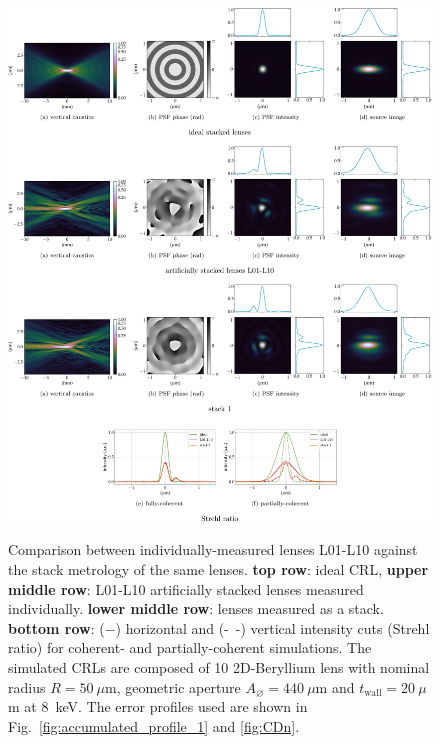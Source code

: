 \begin{refsection}
\begin{figure}[ht]
        \centering
        {\includegraphics[width=1\linewidth]{figures/ch05/CDn_vs_CDnStack.pdf}}
        \caption[Artificially stacked lenses L01-L11 vs. stack 1 comparison]{Comparison between individually-measured lenses L01-L10 against the stack metrology of the same lenses. \textbf{top row}: ideal CRL, \textbf{upper middle row}: L01-L10 artificially stacked lenses measured individually. \textbf{lower middle row}: lenses measured as a stack. \textbf{bottom row}: ($-$) horizontal and (-~-) vertical intensity cuts (Strehl ratio) for coherent- and partially-coherent simulations. The simulated CRLs are composed of 10 2D-Beryllium lens with nominal radius $R=50~\mu\text{m}$, geometric aperture $A_{\diameter}=440~\mu\text{m}$ and $t_\text{wall}=20~\mu$m at 8~keV. The error profiles used are shown in Fig.~\ref{fig:accumulated_profile_1} and \ref{fig:CDn}.}\label{fig:CDn_vs_CDnStack}
\end{figure}


\end{refsection}
